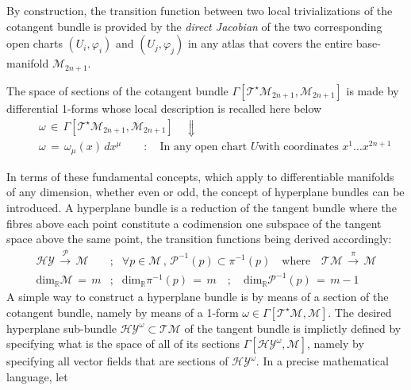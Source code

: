 \documentclass[10pt,a4paper]{article}
\begin{document}
By construction, the transition function between two local trivializations of the cotangent bundle is provided by the \textit{direct Jacobian} of the two corresponding open charts $(U_i,\varphi_i)$ and
$(U_j,\varphi_j)$  in any atlas that covers the entire base-manifold
 $\mathcal{M}_{2n+1}$.
\par
The space of sections of the cotangent bundle
$\Gamma\left[\mathcal{T}^\star\mathcal{M}_{2n+1},\mathcal{M}_{2n+1}\right]$
is made by differential 1-forms whose local description is recalled here below
\begin{eqnarray}\label{vettorifildi}
    &&\omega \, \in \, \Gamma\left[\mathcal{T}^\star\mathcal{M}_{2n+1},\mathcal{M}_{2n+1}\right] \quad
    \Downarrow \nonumber\\
    &&  \omega \, = \, \omega_\mu \left(x\right)
    \,dx^\mu \quad \quad : \quad \text{In any open chart $U$
    with coordinates $x^1\dots x^{2n+1}$}
\end{eqnarray}
\par
In terms of these fundamental concepts, which apply to differentiable manifolds of any dimension, whether even or odd, the concept of hyperplane bundles can be introduced.
A hyperplane bundle is a reduction of the tangent bundle where the fibres above each point constitute a codimension one subspace of the tangent space above the same point, the transition functions being derived accordingly:
\begin{eqnarray}\label{iperpiano}
    \mathcal{HY}\,
    \stackrel{\mathcal{P}}{\longrightarrow} \, \mathcal{M} & ;
    & \forall p \in \mathcal{M} \, , \,
    \mathcal{P}^{-1}(p)
    \subset\pi^{-1}(p) \quad \text{where} \quad \mathcal{T}\mathcal{M} \, \stackrel{\pi}{\longrightarrow} \,
    \mathcal{M}\nonumber\\
    \mathrm{dim}_\mathbb{R}\mathcal{M}\, = \, m & ;&\mathrm{dim}_\mathbb{R}\pi^{-1}(p) \, = \, m \quad ; \quad
    \mathrm{dim}_\mathbb{R}\mathcal{P}^{-1}(p) \, = \, m-1
\end{eqnarray}
A simple way to construct a hyperplane bundle is by means of a section of the cotangent bundle, namely by means of a 1-form  $\omega \in \Gamma\left[\mathcal{T}^\star
\mathcal{M},\mathcal{M}\right]$.
The desired hyperplane sub-bundle
$\mathcal{HY}^\omega \subset \mathcal{TM}$ of the tangent bundle
is implictly defined by specifying  what is the space of all of its sections
$\Gamma\left[\mathcal{HY}^\omega,\mathcal{M}\right]$,  namely by specifying all vector fields that are sections of
$\mathcal{HY}^\omega$. In a precise mathematical language, let
\end{document}
